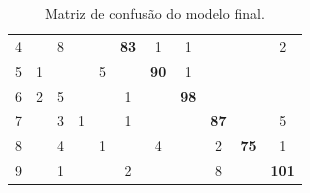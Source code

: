 \documentclass[
	12pt,				%
	openright,			%
	twoside,			%
	a4paper,			%
	english,			%
	brazil,				%
	svgnames
	]{abntex2}\usepackage[]{graphicx}\usepackage[]{color}
\begin{document}
\begin{table}[h]
\begin{tabular}{c|cccccccccc}
4 &                                  & 8                                &                                   & \multicolumn{1}{c|}{}            & \multicolumn{1}{c|}{\textbf{83}} & 1                                & 1                                &                                  &                                  & 2                                 \\ \cline{6-7}
5 & 1                                &                                  &                                   & 5                                & \multicolumn{1}{c|}{}            & \multicolumn{1}{c|}{\textbf{90}} & 1                                &                                  &                                  &                                   \\ \cline{7-8}
6 & 2                                & 5                                &                                   &                                  & 1                                & \multicolumn{1}{c|}{}            & \multicolumn{1}{c|}{\textbf{98}} &                                  &                                  &                                   \\ \cline{8-9}
7 &                                  & 3                                & 1                                 &                                  & 1                                &                                  & \multicolumn{1}{c|}{}            & \multicolumn{1}{c|}{\textbf{87}} &                                  & 5                                 \\ \cline{9-10}
8 &                                  & 4                                &                                   & 1                                &                                  & 4                                &                                  & \multicolumn{1}{c|}{2}           & \multicolumn{1}{c|}{\textbf{75}} & 1                                 \\ \cline{10-11} 
9 &                                  & 1                                &                                   &                                  & 2                                &                                  &                                  & 8                                & \multicolumn{1}{c|}{}            & \multicolumn{1}{c|}{\textbf{101}} \\ \hline
\end{tabular}
\caption{Matriz de confusão do modelo final.}
\label{tab:table2}
\end{table}
\end{document}
